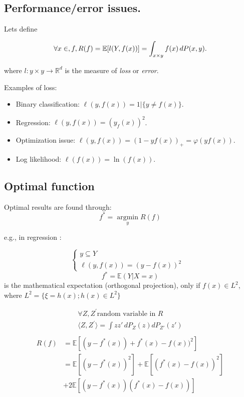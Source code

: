 		\subsection{Performance/error issues.}

			Lets define

			\[ \forall x \in, \mathnormal{f}, R(f)=\mathbb{E}[l(Y,f(x))] =  \int_{x{\times}y} f(x)\,dP(x,y).\] 

			where $l:y{\times}y \rightarrow \mathbb{R}^d$ is the measure of \emph{loss} or \emph{error}.
			
			Examples of loss:
					\begin{itemize}
							\item Binary classification: $\ell(y,f(x)) = 1|\{y \neq f(x)\}$.
							\item Regression: $\ell(y,f(x))=(y_f(x))^2$.
							\item Optimization issue: $\ell(y,f(x))=(1-yf(x))_+ = \varphi(yf(x))$.
							\item Log likelihood: $\ell(f(x))=\ln(f(x))$.
					\end{itemize}

		\subsection{Optimal function}
			Optimal results are found through:
			\[
				f^*=\underset{y}{\operatorname{argmin}}R(f) 
			\]

			e.g., in regression :

			\[
			  \begin{cases}
			   y \subseteq Y &  \\
			   \ell(y,f(x)) = (y-f(x))^2   & 
			  \end{cases}
			\]
			\[
				f^*=\mathbb{E}(Y|X=x) 
			\]
			is the mathematical expectation (orthogonal projection), only if $f(x)\in L^2$, where $L^2 = \{\xi = h(x);h(x)\in L^2\}$

		  \begin{align*}
				\forall Z, Z^{'} \mbox{random variable in } R\\
				\langle Z,Z^{'}\rangle = \int zz'\, dP_Z(z)dP_{Z'}(z')\\
		  \end{align*}
		  \begin{align*}
            R(f) &= \mathbb{E} [(y-f^*(x))+f^*(x)-f(x))^2]\\
						 &= \mathbb{E}[(y-f^*(x))^2]+\mathbb{E}[(f^*(x)-f(x))^2]\\
						 &+ 2\mathbb{E}[(y-f^*(x))(f^*(x)-f(x))]
		  \end{align*}

